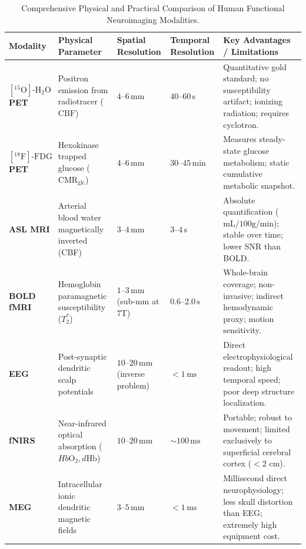 \documentclass[11pt,a4paper]{article}
\begin{document}
\begin{table}[htbp]
\centering
\small
\setlength{\tabcolsep}{3pt}
\caption{Comprehensive Physical and Practical Comparison of Human Functional Neuroimaging Modalities.}
\label{tab:multimodal_comp}
\begin{tabular}{p{2.2cm} p{3.0cm} p{2.2cm} p{2.5cm} p{4.2cm}}
\toprule
\textbf{Modality} & \textbf{Physical Parameter} & \textbf{Spatial Resolution} & \textbf{Temporal Resolution} & \textbf{Key Advantages / Limitations} \\
\midrule
\textbf{$[^{15}\text{O}]\text{-H}_2\text{O}$ PET} & Positron emission from radiotracer ($\text{CBF}$) & $4\text{--}6\,\text{mm}$ & $40\text{--}60\,\text{s}$ & Quantitative gold standard; no susceptibility artifact; ionizing radiation; requires cyclotron. \\
\addlinespace
\textbf{$[^{18}\text{F}]\text{-FDG}$ PET} & Hexokinase trapped glucose ($\text{CMR}_{\text{glc}}$) & $4\text{--}6\,\text{mm}$ & $30\text{--}45\,\text{min}$ & Measures steady-state glucose metabolism; static cumulative metabolic snapshot. \\
\addlinespace
\textbf{ASL MRI} & Arterial blood water magnetically inverted (CBF) & $3\text{--}4\,\text{mm}$ & $3\text{--}4\,\text{s}$ & Absolute quantification ($\text{mL}/100\text{g}/\text{min}$); stable over time; lower SNR than BOLD. \\
\addlinespace
\textbf{BOLD fMRI} & Hemoglobin paramagnetic susceptibility ($T_2^*$) & $1\text{--}3\,\text{mm}$ (sub-mm at 7T) & $0.6\text{--}2.0\,\text{s}$ & Whole-brain coverage; non-invasive; indirect hemodynamic proxy; motion sensitivity. \\
\addlinespace
\textbf{EEG} & Post-synaptic dendritic scalp potentials & $10\text{--}20\,\text{mm}$ (inverse problem) & $< 1\,\text{ms}$ & Direct electrophysiological readout; high temporal speed; poor deep structure localization. \\
\addlinespace
\textbf{fNIRS} & Near-infrared optical absorption ($Hb\text{O}_2, d\text{Hb}$) & $10\text{--}20\,\text{mm}$ & $\sim 100\,\text{ms}$ & Portable; robust to movement; limited exclusively to superficial cerebral cortex ($< 2\text{ cm}$). \\
\addlinespace
\textbf{MEG} & Intracellular ionic dendritic magnetic fields & $3\text{--}5\,\text{mm}$ & $< 1\,\text{ms}$ & Millisecond direct neurophysiology; less skull distortion than EEG; extremely high equipment cost. \\
\bottomrule
\end{tabular}
\end{table}
\end{document}
